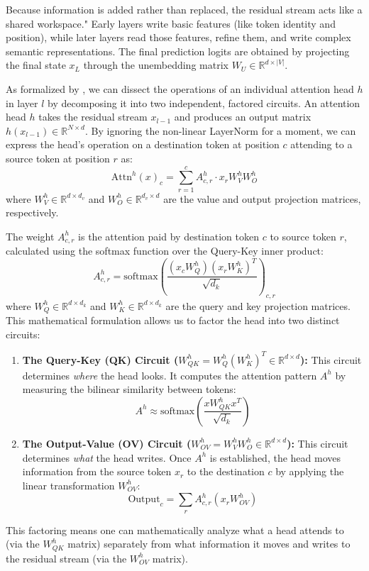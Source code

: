\documentclass[11pt]{article}
\begin{document}
Because information is added rather than replaced, the residual stream acts like a shared workspace." Early layers write basic features (like token identity and position), while later layers read those features, refine them, and write complex semantic representations. The final prediction logits are obtained by projecting the final state $x_L$ through the unembedding matrix $W_U \in \mathbb{R}^{d \times |V|}$.

As formalized by \citet{Elhage2021}, we can dissect the operations of an individual attention head $h$ in layer $l$ by decomposing it into two independent, factored circuits. An attention head $h$ takes the residual stream $x_{l-1}$ and produces an output matrix $h(x_{l-1}) \in \mathbb{R}^{N \times d}$. By ignoring the non-linear LayerNorm for a moment, we can express the head's operation on a destination token at position $c$ attending to a source token at position $r$ as:
\begin{equation}
    \text{Attn}^h(x)_{c} = \sum_{r=1}^{c} A^h_{c,r} \cdot x_{r} W_V^h W_O^h
\end{equation}
where $W_V^h \in \mathbb{R}^{d \times d_v}$ and $W_O^h \in \mathbb{R}^{d_v \times d}$ are the value and output projection matrices, respectively.

The weight $A^h_{c,r}$ is the attention paid by destination token $c$ to source token $r$, calculated using the softmax function over the Query-Key inner product:
\begin{equation}
    A^h_{c,r} = \text{softmax} \left( \frac{(x_c W_Q^h)(x_r W_K^h)^T}{\sqrt{d_k}} \right)_{c,r}
\end{equation}
where $W_Q^h \in \mathbb{R}^{d \times d_k}$ and $W_K^h \in \mathbb{R}^{d \times d_k}$ are the query and key projection matrices. This mathematical formulation allows us to factor the head into two distinct circuits:
\begin{enumerate}
    \item \textbf{The Query-Key (QK) Circuit ($W_{QK}^h = W_Q^h (W_K^h)^T \in \mathbb{R}^{d \times d}$):} This circuit determines \textit{where} the head looks. It computes the attention pattern $A^h$ by measuring the bilinear similarity between tokens:
    \begin{equation}
        A^h \approx \text{softmax} \left( \frac{x W_{QK}^h x^T}{\sqrt{d_k}} \right)
    \end{equation}
    \item \textbf{The Output-Value (OV) Circuit ($W_{OV}^h = W_V^h W_O^h \in \mathbb{R}^{d \times d}$):} This circuit determines \textit{what} the head writes. Once $A^h$ is established, the head moves information from the source token $x_r$ to the destination $c$ by applying the linear transformation $W_{OV}^h$:
    \begin{equation}
        \text{Output}_c = \sum_{r} A^h_{c,r} (x_r W_{OV}^h)
    \end{equation}
\end{enumerate}
This factoring means one can mathematically analyze what a head attends to (via the $W_{QK}^h$ matrix) separately from what information it moves and writes to the residual stream (via the $W_{OV}^h$ matrix).
\end{document}
